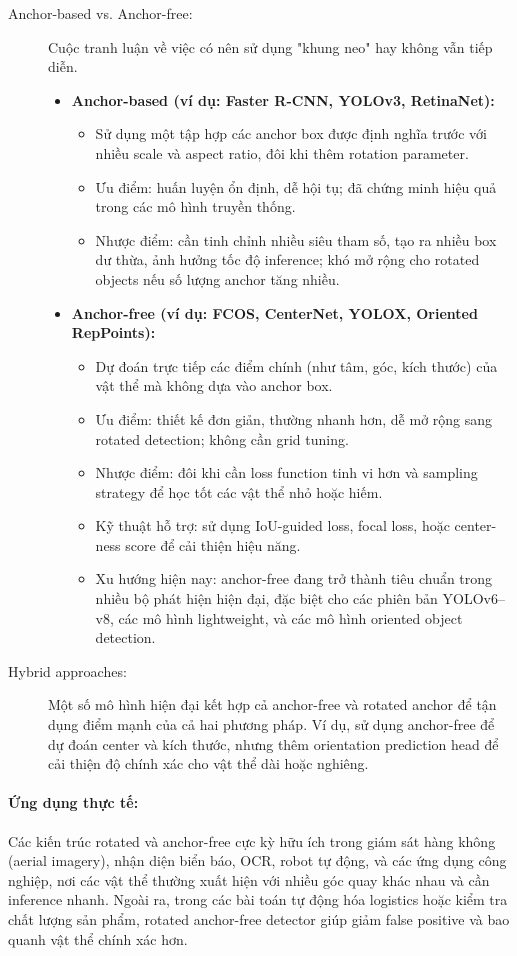 \begin{description}
	\item[Anchor-based vs. Anchor-free:] 
	Cuộc tranh luận về việc có nên sử dụng "khung neo" hay không vẫn tiếp diễn.
	\begin{itemize}
		\item \textbf{Anchor-based (ví dụ: Faster R-CNN, YOLOv3, RetinaNet):} 
		\begin{itemize}
			\item Sử dụng một tập hợp các anchor box được định nghĩa trước với nhiều scale và aspect ratio, đôi khi thêm rotation parameter.
			\item Ưu điểm: huấn luyện ổn định, dễ hội tụ; đã chứng minh hiệu quả trong các mô hình truyền thống.
			\item Nhược điểm: cần tinh chỉnh nhiều siêu tham số, tạo ra nhiều box dư thừa, ảnh hưởng tốc độ inference; khó mở rộng cho rotated objects nếu số lượng anchor tăng nhiều.
		\end{itemize}
		\item \textbf{Anchor-free (ví dụ: FCOS, CenterNet, YOLOX, Oriented RepPoints):} 
		\begin{itemize}
			\item Dự đoán trực tiếp các điểm chính (như tâm, góc, kích thước) của vật thể mà không dựa vào anchor box.
			\item Ưu điểm: thiết kế đơn giản, thường nhanh hơn, dễ mở rộng sang rotated detection; không cần grid tuning.
			\item Nhược điểm: đôi khi cần loss function tinh vi hơn và sampling strategy để học tốt các vật thể nhỏ hoặc hiếm.
			\item Kỹ thuật hỗ trợ: sử dụng IoU-guided loss, focal loss, hoặc center-ness score để cải thiện hiệu năng.
			\item Xu hướng hiện nay: anchor-free đang trở thành tiêu chuẩn trong nhiều bộ phát hiện hiện đại, đặc biệt cho các phiên bản YOLOv6–v8, các mô hình lightweight, và các mô hình oriented object detection.
		\end{itemize}
	\end{itemize}
	
	\item[Hybrid approaches:] Một số mô hình hiện đại kết hợp cả anchor-free và rotated anchor để tận dụng điểm mạnh của cả hai phương pháp. Ví dụ, sử dụng anchor-free để dự đoán center và kích thước, nhưng thêm orientation prediction head để cải thiện độ chính xác cho vật thể dài hoặc nghiêng.
\end{description}

\paragraph{Ứng dụng thực tế:}  
Các kiến trúc rotated và anchor-free cực kỳ hữu ích trong giám sát hàng không (aerial imagery), nhận diện biển báo, OCR, robot tự động, và các ứng dụng công nghiệp, nơi các vật thể thường xuất hiện với nhiều góc quay khác nhau và cần inference nhanh. Ngoài ra, trong các bài toán tự động hóa logistics hoặc kiểm tra chất lượng sản phẩm, rotated anchor-free detector giúp giảm false positive và bao quanh vật thể chính xác hơn.

